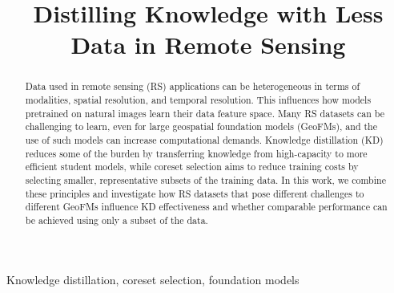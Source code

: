 \documentclass[conference]{IEEEtran}
\begin{document}
\title{Distilling Knowledge with Less Data in Remote Sensing \\ %
}


\author{


}

\maketitle

\begin{abstract}
	Data used in remote sensing (RS) applications can be heterogeneous in terms of modalities, spatial resolution, and temporal resolution.
	This influences how models pretrained on natural images learn their data feature space. Many RS datasets can be challenging to learn, even for large geospatial foundation models (GeoFMs), and the use of such models can increase computational demands.
	Knowledge distillation (KD) reduces some of the burden by transferring knowledge from high-capacity to more efficient student models, while coreset selection aims to reduce training costs by selecting smaller, representative subsets of the training data.
	In this work, we combine these principles and investigate how RS datasets that pose different challenges to different GeoFMs influence KD effectiveness and whether comparable performance can be achieved using only a subset of the data.

\end{abstract}

\begin{IEEEkeywords}
	Knowledge distillation, coreset selection, foundation models
\end{IEEEkeywords}
\end{document}
